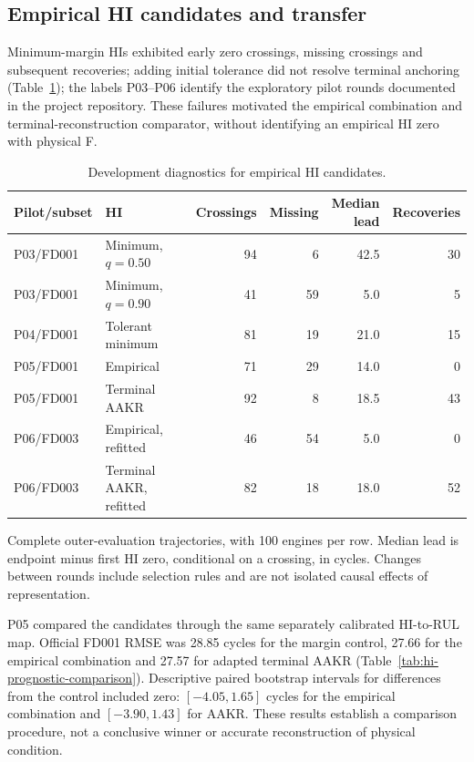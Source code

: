 \documentclass[12pt]{article}
\newcommand{\tablenotes}[1]{\par\smallskip\begin{minipage}{\linewidth}\footnotesize\raggedright\setlength{\parindent}{0pt}#1\end{minipage}}
\begin{document}
\subsection*{Empirical HI candidates and transfer}
Minimum-margin HIs exhibited early zero crossings, missing crossings and subsequent recoveries; adding initial tolerance did not resolve terminal anchoring (Table~\ref{tab:hi-terminal-development}); the labels P03--P06 identify the exploratory pilot rounds documented in the project repository. These failures motivated the empirical combination and terminal-reconstruction comparator, without identifying an empirical HI zero with physical F.

\begin{table}[htbp]
\centering
\caption{Development diagnostics for empirical HI candidates.}
\label{tab:hi-terminal-development}
\footnotesize
\setlength{\tabcolsep}{3.5pt}
\setlength{\tabcolsep}{3pt}
\begin{tabularx}{\linewidth}{@{}lXrrrr@{}}
\toprule
Pilot/subset & HI & Crossings & Missing & \shortstack{Median\\lead} & Recoveries \\
\midrule
P03/FD001 & Minimum, $q=0.50$ & 94 & 6 & 42.5 & 30 \\
P03/FD001 & Minimum, $q=0.90$ & 41 & 59 & 5.0 & 5 \\
P04/FD001 & Tolerant minimum & 81 & 19 & 21.0 & 15 \\
P05/FD001 & Empirical & 71 & 29 & 14.0 & 0 \\
P05/FD001 & Terminal AAKR & 92 & 8 & 18.5 & 43 \\
P06/FD003 & Empirical, refitted & 46 & 54 & 5.0 & 0 \\
P06/FD003 & Terminal AAKR, refitted & 82 & 18 & 18.0 & 52 \\
\bottomrule
\end{tabularx}
\tablenotes{Complete outer-evaluation trajectories, with 100 engines per row. Median lead is endpoint minus first HI zero, conditional on a crossing, in cycles. Changes between rounds include selection rules and are not isolated causal effects of representation.}
\end{table}

P05 compared the candidates through the same separately calibrated HI-to-RUL map. Official FD001 RMSE was 28.85 cycles for the margin control, 27.66 for the empirical combination and 27.57 for adapted terminal AAKR (Table~\ref{tab:hi-prognostic-comparison}). Descriptive paired bootstrap intervals for differences from the control included zero: $[-4.05,1.65]$ cycles for the empirical combination and $[-3.90,1.43]$ for AAKR. These results establish a comparison procedure, not a conclusive winner or accurate reconstruction of physical condition.
\end{document}
